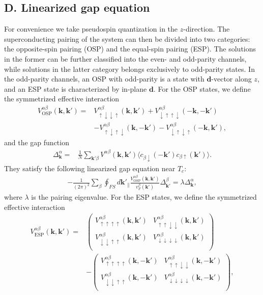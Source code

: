\documentclass[aps,prl,twocolumn,superscriptaddress,showpacs]{revtex4-1}
\newcommand{\bs}{\boldsymbol}
\begin{document}
\subsection{D. Linearized gap equation}
For convenience we take pseudospin quantization in the $z$-direction. The superconducting pairing of the system can then be divided into two categories: the opposite-spin pairing (OSP) and the equal-spin pairing (ESP). The solutions in the former can be further classified into the even- and odd-parity channels, while solutions in the latter category belongs exclusively to odd-parity states. In the odd-parity channels, an OSP with odd-parity is a state with ${\bs d}$-vector along $z$, and an ESP state is characterized by in-plane ${\bs d}$.  For the OSP states, we define the symmetrized effective interaction \begin{align}
V^{\alpha\beta}_\text{OSP}(\bm{k},\bm{k}')
=&V^{\alpha\beta}_{\uparrow\downarrow\downarrow\uparrow}(\bm{k},\bm{k}')
+V^{\alpha\beta}_{\downarrow\uparrow\uparrow\downarrow}(-\bm{k},-\bm{k}')   \nonumber\\
&-V^{\alpha\beta}_{\uparrow\downarrow\uparrow\downarrow}(\bm{k},-\bm{k}')
-V^{\alpha\beta}_{\downarrow\uparrow\downarrow\uparrow}(-\bm{k},\bm{k}'),
\end{align}
and the gap function
\begin{align}
\Delta^{\alpha}_{\bm{k}}=&\frac{1}{N}
\sum_{\bm{k}'\beta}V^{\alpha\beta}(\bm{k},\bm{k}')
\Big\langle c_{\beta\downarrow}(-\bm{k}')
c_{\beta\uparrow}(\bm{k}')\Big\rangle.
\end{align}
They satisfy the following linearized gap equation near $T_c$:
\begin{align}
-\frac{1}{(2\pi)^2}\sum_{\beta}\oint_{FS}d\bm{k}'_{\parallel}
\frac{V^{\alpha\beta}_\text{OSP}(\bm{k},\bm{k}')}
{v^{\beta}_F(\bm{k}')}\Delta^{\beta}_{\bm{k}'}
=\lambda\Delta^{\alpha}_{\bm{k}},
\end{align}
where $\lambda$ is the pairing eigenvalue. For the ESP states, we define the symmetrized effective interaction
\begin{align}\label{Delta1}
V^{\alpha\beta}_\text{ESP}(\bm{k},\bm{k}')=&\left(
\begin{array}{cc}
V^{\alpha\beta}_{\uparrow\uparrow\uparrow\uparrow}(\bm{k},\bm{k}')
& V^{\alpha\beta}_{\uparrow\uparrow\downarrow\downarrow}(\bm{k},\bm{k}') \\
V^{\alpha\beta}_{\downarrow\downarrow\uparrow\uparrow}(\bm{k},\bm{k}')
& V^{\alpha\beta}_{\downarrow\downarrow\downarrow\downarrow}(\bm{k},\bm{k}') \\
\end{array}
\right)               \nonumber\\
&-\left(
\begin{array}{cc}
V^{\alpha\beta}_{\uparrow\uparrow\uparrow\uparrow}(\bm{k},-\bm{k}')
& V^{\alpha\beta}_{\uparrow\uparrow\downarrow\downarrow}(\bm{k},-\bm{k}') \\
V^{\alpha\beta}_{\downarrow\downarrow\uparrow\uparrow}(\bm{k},-\bm{k}')
& V^{\alpha\beta}_{\downarrow\downarrow\downarrow\downarrow}(\bm{k},-\bm{k}') \\
\end{array}
\right),
\end{align}
\end{document}
